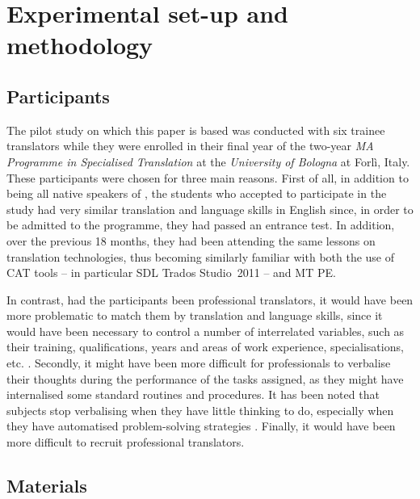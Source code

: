 \documentclass[output=paper]{LSP/langsci}
\begin{document}
\section{Experimental set-up and methodology}\label{ressetti-gaspari:sec:3}
\subsection{Participants}\label{ressetti-gaspari:sec:3.1}

The pilot study on which this paper is based was conducted with six  trainee translators while they were enrolled in their final year of the two-year \textit{MA Programme in Specialised Translation} at the \textit{University of Bologna} at Forlì, Italy. These participants were chosen for three main reasons. First of all, in addition to being all native speakers of , the students who accepted to participate in the study had very similar translation and language skills in English since, in order to be admitted to the programme, they had passed an entrance test. In addition, over the previous 18 months, they had been attending the same lessons on translation technologies, thus becoming similarly familiar with both the use of CAT tools -- in particular SDL Trados Studio~2011 -- and MT PE.

In contrast, had the participants been professional translators, it would have been more problematic to match them by translation and language skills, since it would have been necessary to control a number of interrelated variables, such as their training, qualifications, years and areas of work experience, specialisations, etc. \citep{Jaaskelainen2000}. Secondly, it might have been more difficult for professionals to verbalise their thoughts during the performance of the tasks assigned, as they might have internalised some standard routines and procedures. It has been noted that subjects stop verbalising when they have little thinking to do, especially when they have automatised problem-solving strategies \citep{Ericsson1993}. Finally, it would have been more difficult to recruit professional translators.

\subsection{Materials}\label{ressetti-gaspari:sec:3.2}
\end{document}
